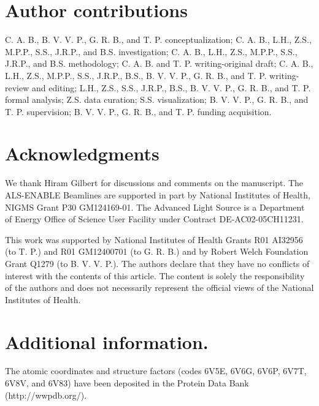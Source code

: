\documentclass[../main.tex]{subfiles}
\begin{document}
    \section{Author contributions}
    C. A. B., B. V. V. P., G. R. B., and T. P. conceptualization; C. A. B., L.H., Z.S., M.P.P., S.S., J.R.P., and B.S. investigation; C. A. B., L.H., Z.S., M.P.P., S.S., J.R.P., and B.S. methodology; C. A. B. and T. P. writing-original draft; C. A. B., L.H., Z.S., M.P.P., S.S., J.R.P., B.S., B. V. V. P., G. R. B., and T. P. writing-review and editing; L.H., Z.S., S.S., J.R.P., B.S., B. V. V. P., G. R. B., and T. P. formal analysis; Z.S. data curation; S.S. visualization; B. V. V. P., G. R. B., and T. P. supervision; B. V. V. P., G. R. B., and T. P. funding acquisition.


       
    \section{Acknowledgments}
        We thank Hiram Gilbert for discussions and comments on the manuscript. The ALS-ENABLE Beamlines are supported in part by National Institutes of Health, NIGMS Grant P30 GM124169-01. The Advanced Light Source is a Department of Energy Office of Science User Facility under Contract DE-AC02-05CH11231.

        This work was supported by National Institutes of Health Grants R01 AI32956 (to T. P.) and R01 GM12400701 (to G. R. B.) and by Robert Welch Foundation Grant Q1279 (to B. V. V. P.). The authors declare that they have no conflicts of interest with the contents of this article. The content is solely the responsibility of the authors and does not necessarily represent the official views of the National Institutes of Health.

    \section{Additional information.}
        The atomic coordinates and structure factors (codes 6V5E, 6V6G, 6V6P, 6V7T, 6V8V, and 6V83) have been deposited in the Protein Data Bank (http://wwpdb.org/).
\end{document}
